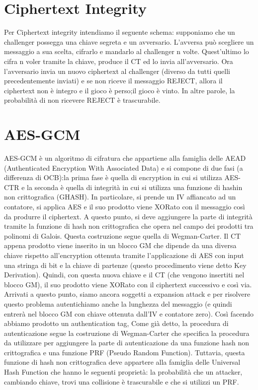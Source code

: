 \documentclass[a4paper,draft]{article}
\begin{document}
\section{Ciphertext Integrity}
Per Ciphertext integrity intendiamo il seguente schema: supponiamo che un challenger possegga una chiave segreta e un avversario. L'avversa può scegliere un messaggio a sua scelta, cifrarlo e mandarlo al challenger n volte\@. Quest'ultimo lo cifra n voler tramite la chiave, produce il CT ed lo invia all'avversario\@.
Ora l'avversario invia un nuovo ciphertext al challenger (diverso da tutti quelli precedentemente inviati) e se non riceve il messaggio REJECT, allora il ciphertext non è integro e il gioco è perso;\@altrimenti il gioco è vinto\@.\newline
In altre parole, la probabilità di non ricevere REJECT è trascurabile\@.
\section{AES-GCM}
AES-GCM è un algoritmo di cifratura che appartiene alla famiglia delle AEAD (Authenticated Encryption With Associated Data) e si compone di due fasi (a differenza di OCB):\@ la prima fase è quella di encryption in cui si utilizza AES-CTR e la seconda è quella di integrità in cui si utilizza una funzione di hashin non crittografica (GHASH)\@.\newline
In particolare, si prende un IV affiancato ad un contatore, si applica AES e il suo prodotto viene XORato con il messaggio così da produrre il ciphertext\@.
A questo punto, si deve aggiungere la parte di integrità tramite la funzione di hash non crittografica che opera nel campo dei prodotti tra polinomi di Galois\@. Questa costruzione segue quella di Wegman-Carter\@. Il CT appena prodotto viene inserito in un blocco GM che dipende da una diversa chiave rispetto all'encryption ottenuta tramite l'applicazione di AES con input una stringa di bit e la chiave di partenze (questo procedimento viene detto Key Derivation)\@.
Quindi, con questa nuova chiave e il CT (che vengono insertiti nel blocco GM), il suo prodotto viene XORato con il ciphertext successivo e così via\@.\newline
Arrivati a questo punto, siamo ancora soggetti a expansion attack e per risolvere questo problema autentichiamo anche la lunghezza del messaggio (e quindi entrerà nel blocco GM con chiave ottenuta dall'IV e contatore zero)\@. Così facendo abbiamo prodotto un authentication tag\@,\newline
Come già detto, la procedura di autenticazione segue la costruzione di Wegman-Carter che specifica la procedura da utilizzare per aggiungere la parte di autenticazione da una funzione hash non crittografica e una funzione PRF (Pseudo Random Function)\@. Tuttavia, questa funzione di hash non crittografica deve appartere alla famiglia delle Universal Hash Function che hanno le seguenti proprietà: la probabilità che un attacker, cambiando chiave, trovi una collisione è trascurabile e che si utilizzi un PRF\@.
\end{document}
